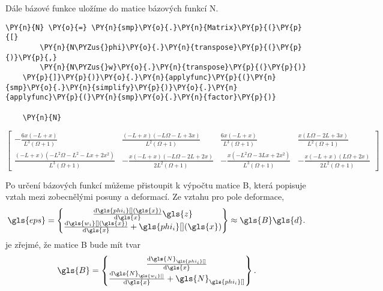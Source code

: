 \vspace{0.3cm}
Dále bázové funkce uložíme do matice bázových funkcí \gls{N}.   
    
\begin{tcolorbox}[breakable, size=fbox, boxrule=1pt, pad at break*=1mm,colback=cellbackground, colframe=cellborder]
    \begin{Verbatim}[commandchars=\\\{\}]
    \PY{n}{N} \PY{o}{=} \PY{n}{smp}\PY{o}{.}\PY{n}{Matrix}\PY{p}{(}\PY{p}{[}
        \PY{n}{N\PYZus{}phi}\PY{o}{.}\PY{n}{transpose}\PY{p}{(}\PY{p}{)}\PY{p}{,}
        \PY{n}{N\PYZus{}w}\PY{o}{.}\PY{n}{transpose}\PY{p}{(}\PY{p}{)}
    \PY{p}{]}\PY{p}{)}\PY{o}{.}\PY{n}{applyfunc}\PY{p}{(}\PY{n}{smp}\PY{o}{.}\PY{n}{simplify}\PY{p}{)}\PY{o}{.}\PY{n}{applyfunc}\PY{p}{(}\PY{n}{smp}\PY{o}{.}\PY{n}{factor}\PY{p}{)}
    
    \PY{n}{N}
    \end{Verbatim}
\end{tcolorbox}
     
                
    
    $\displaystyle \left[\begin{matrix}- \frac{6 x \left(- L + x\right)}{L^{3} \left(\Omega + 1\right)} & \frac{\left(- L + x\right) \left(- L \Omega - L + 3 x\right)}{L^{2} \left(\Omega + 1\right)} & \frac{6 x \left(- L + x\right)}{L^{3} \left(\Omega + 1\right)} & \frac{x \left(L \Omega - 2 L + 3 x\right)}{L^{2} \left(\Omega + 1\right)}\\\frac{\left(- L + x\right) \left(- L^{2} \Omega - L^{2} - L x + 2 x^{2}\right)}{L^{3} \left(\Omega + 1\right)} & - \frac{x \left(- L + x\right) \left(- L \Omega - 2 L + 2 x\right)}{2 L^{2} \left(\Omega + 1\right)} & - \frac{x \left(- L^{2} \Omega - 3 L x + 2 x^{2}\right)}{L^{3} \left(\Omega + 1\right)} & - \frac{x \left(- L + x\right) \left(L \Omega + 2 x\right)}{2 L^{2} \left(\Omega + 1\right)}\end{matrix}\right]$
    
\vspace{0.3cm}
Po určení bázových funkcí můžeme přistoupit k výpočtu matice \gls{B}, která popisuje vztah mezi zobecnělými posuny a deformací. Ze vztahu pro pole deformace,
\begin{equation}
    \gls{eps}
    =
    \begin{Bmatrix}
        \dv{\gls{phi_i}[ ](\gls{x})}{\gls{x}} \gls{z} \\
        \dv{\gls{w_i}[ ](\gls{x})}{\gls{x}} + \gls{phi_i}[ ](\gls{x})
    \end{Bmatrix}
    \approx
    \gls{B}\gls{d}.
\end{equation}
je zřejmé, že matice \gls{B} bude mít tvar
\begin{equation}
    \gls{B}
    =
    \begin{Bmatrix}
        \dv{\gls{N}_{\gls{phi_i}[ ]}}{\gls{x}} \\
        \dv{\gls{N}_{\gls{w_i}[ ]}}{\gls{x}} + \gls{N}_{\gls{phi_i}[ ]}
    \end{Bmatrix}.
\end{equation}


